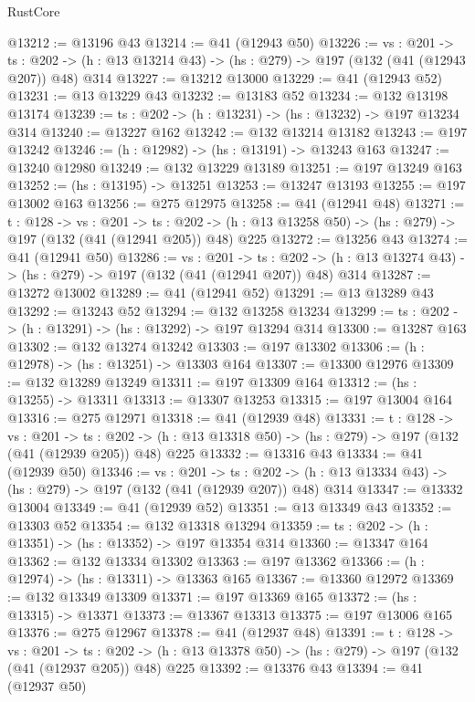 \begin{lexlean}{RustCore}
\begin{coremodule}
@13212 := @13196 @43
@13214 := @41 (@12943 @50)
@13226 := {vs : @201} ->
  {ts : @202} -> (h : @13 @13214 @43) -> (hs : @279) -> @197 (@132 (@41 (@12943 @207)) @48) @314
@13227 := @13212 @13000
@13229 := @41 (@12943 @52)
@13231 := @13 @13229 @43
@13232 := @13183 @52
@13234 := @132 @13198 @13174
@13239 := {ts : @202} -> (h : @13231) -> (hs : @13232) -> @197 @13234 @314
@13240 := @13227 @162
@13242 := @132 @13214 @13182
@13243 := @197 @13242
@13246 := (h : @12982) -> (hs : @13191) -> @13243 @163
@13247 := @13240 @12980
@13249 := @132 @13229 @13189
@13251 := @197 @13249 @163
@13252 := (hs : @13195) -> @13251
@13253 := @13247 @13193
@13255 := @197 @13002 @163
@13256 := @275 @12975
@13258 := @41 (@12941 @48)
@13271 := {t : @128} ->
  {vs : @201} ->
  {ts : @202} -> (h : @13 @13258 @50) -> (hs : @279) -> @197 (@132 (@41 (@12941 @205)) @48) @225
@13272 := @13256 @43
@13274 := @41 (@12941 @50)
@13286 := {vs : @201} ->
  {ts : @202} -> (h : @13 @13274 @43) -> (hs : @279) -> @197 (@132 (@41 (@12941 @207)) @48) @314
@13287 := @13272 @13002
@13289 := @41 (@12941 @52)
@13291 := @13 @13289 @43
@13292 := @13243 @52
@13294 := @132 @13258 @13234
@13299 := {ts : @202} -> (h : @13291) -> (hs : @13292) -> @197 @13294 @314
@13300 := @13287 @163
@13302 := @132 @13274 @13242
@13303 := @197 @13302
@13306 := (h : @12978) -> (hs : @13251) -> @13303 @164
@13307 := @13300 @12976
@13309 := @132 @13289 @13249
@13311 := @197 @13309 @164
@13312 := (hs : @13255) -> @13311
@13313 := @13307 @13253
@13315 := @197 @13004 @164
@13316 := @275 @12971
@13318 := @41 (@12939 @48)
@13331 := {t : @128} ->
  {vs : @201} ->
  {ts : @202} -> (h : @13 @13318 @50) -> (hs : @279) -> @197 (@132 (@41 (@12939 @205)) @48) @225
@13332 := @13316 @43
@13334 := @41 (@12939 @50)
@13346 := {vs : @201} ->
  {ts : @202} -> (h : @13 @13334 @43) -> (hs : @279) -> @197 (@132 (@41 (@12939 @207)) @48) @314
@13347 := @13332 @13004
@13349 := @41 (@12939 @52)
@13351 := @13 @13349 @43
@13352 := @13303 @52
@13354 := @132 @13318 @13294
@13359 := {ts : @202} -> (h : @13351) -> (hs : @13352) -> @197 @13354 @314
@13360 := @13347 @164
@13362 := @132 @13334 @13302
@13363 := @197 @13362
@13366 := (h : @12974) -> (hs : @13311) -> @13363 @165
@13367 := @13360 @12972
@13369 := @132 @13349 @13309
@13371 := @197 @13369 @165
@13372 := (hs : @13315) -> @13371
@13373 := @13367 @13313
@13375 := @197 @13006 @165
@13376 := @275 @12967
@13378 := @41 (@12937 @48)
@13391 := {t : @128} ->
  {vs : @201} ->
  {ts : @202} -> (h : @13 @13378 @50) -> (hs : @279) -> @197 (@132 (@41 (@12937 @205)) @48) @225
@13392 := @13376 @43
@13394 := @41 (@12937 @50)

\end{coremodule}
\end{lexlean}
